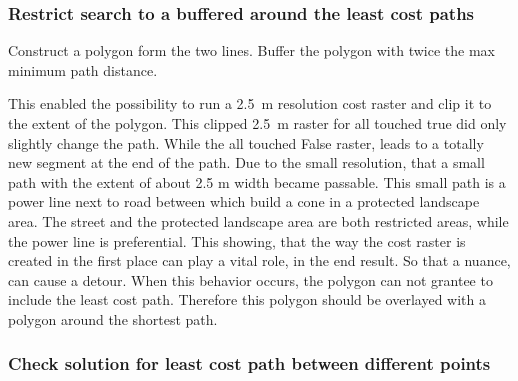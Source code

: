 \subsubsection{Restrict search to a buffered around the least cost paths}

Construct a polygon form the two lines.
Buffer the polygon with twice the max minimum path distance.


This enabled the possibility  to run a 2.5~m resolution cost raster and clip it to the extent of the polygon. 
This clipped 2.5~m raster for all touched true did only slightly change the path. 
While the all touched False raster, leads to a totally new segment at the end of the path. 
Due to the small resolution, that a small path with the extent of about 2.5 m width became passable.
This small path is a power line next to road between which build a cone in a protected landscape area.
The street and the protected landscape area are both restricted areas, while the power line is preferential.
This showing, that the way the cost raster is created in the first place can play a vital role, in the end result.
So that a nuance, can cause a detour.
When this behavior occurs, the polygon can not grantee to include the least cost path.
Therefore this polygon should be overlayed with a polygon around the shortest path.



\subsubsection{Check solution for least cost path between different points}
